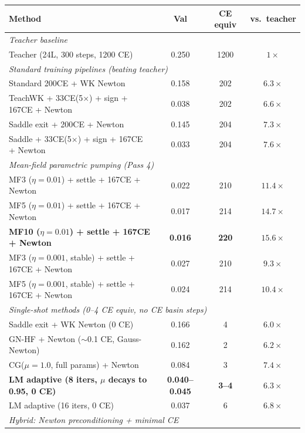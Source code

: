 \documentclass[11pt]{amsart}
\begin{document}
\begin{center}
\small
\renewcommand{\arraystretch}{1.25}
\begin{tabular}{p{6.8cm}ccc}
\toprule
\textbf{Method} & \textbf{Val} & \textbf{CE equiv} & \textbf{vs.\ teacher} \\
\midrule
\multicolumn{4}{l}{\textit{Teacher baseline}} \\
Teacher (24L, 300 steps, 1200 CE) & 0.250 & 1200 & $1\times$ \\
\midrule
\multicolumn{4}{l}{\textit{Standard training pipelines (beating teacher)}} \\
Standard 200CE + WK Newton & 0.158 & 202 & $6.3\times$ \\
TeachWK + 33CE(5$\times$) + sign + 167CE + Newton & 0.038 & 202 & $6.6\times$ \\
Saddle exit + 200CE + Newton & 0.145 & 204 & $7.3\times$ \\
Saddle + 33CE(5$\times$) + sign + 167CE + Newton & 0.033 & 204 & $7.6\times$ \\
\midrule
\multicolumn{4}{l}{\textit{Mean-field parametric pumping (Pass 4)}} \\
MF3 ($\eta{=}0.01$) + settle + 167CE + Newton & 0.022 & 210 & $11.4\times$ \\
MF5 ($\eta{=}0.01$) + settle + 167CE + Newton & 0.017 & 214 & $14.7\times$ \\
\textbf{MF10 ($\eta{=}0.01$) + settle + 167CE + Newton} & \textbf{0.016} & \textbf{220} & $\mathbf{15.6\times}$ \\
MF3 ($\eta{=}0.001$, stable) + settle + 167CE + Newton & 0.027 & 210 & $9.3\times$ \\
MF5 ($\eta{=}0.001$, stable) + settle + 167CE + Newton & 0.024 & 214 & $10.4\times$ \\
\midrule
\multicolumn{4}{l}{\textit{Single-shot methods (0--4 CE equiv, no CE basin steps)}} \\
Saddle exit + WK Newton (0 CE) & 0.166 & 4 & $6.0\times$ \\
GN-HF + Newton ($\sim$0.1 CE, Gauss-Newton) & 0.162 & 2 & $6.2\times$ \\
CG($\mu{=}1.0$, full params) + Newton & 0.084 & 3 & $7.4\times$ \\
\textbf{LM adaptive (8 iters, $\mu$ decays to 0.95, 0 CE)} & \textbf{0.040--0.045} & \textbf{3--4} & $\mathbf{6.3\times}$ \\
LM adaptive (16 iters, 0 CE) & 0.037 & 6 & $6.8\times$ \\
\midrule
\multicolumn{4}{l}{\textit{Hybrid: Newton preconditioning + minimal CE}} \\

\end{tabular}
\end{center}
\end{document}
